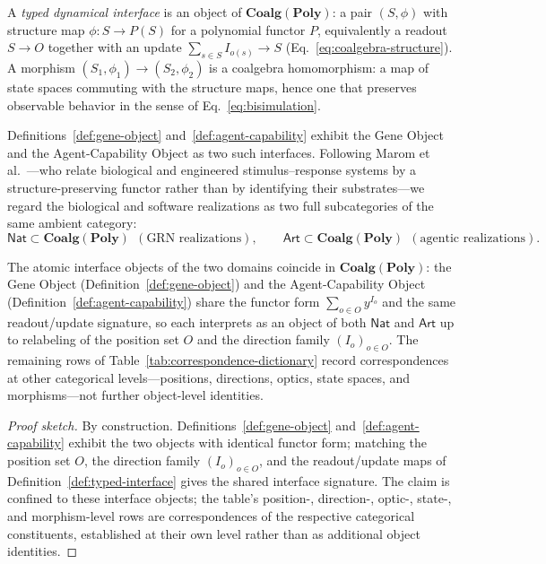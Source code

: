 \begin{definition}\label{def:typed-interface}
A \emph{typed dynamical interface} is an object of $\mathbf{Coalg}(\mathbf{Poly})$: a pair $(S,\phi)$ with
structure map $\phi\colon S \to P(S)$ for a polynomial functor $P$, equivalently a readout $S \to O$ together
with an update $\sum_{s\in S} I_{o(s)} \to S$ (Eq.~\ref{eq:coalgebra-structure}). A morphism
$(S_1,\phi_1)\to(S_2,\phi_2)$ is a coalgebra homomorphism: a map of state spaces commuting with the structure
maps, hence one that preserves observable behavior in the sense of Eq.~\ref{eq:bisimulation}.
\end{definition}

Definitions~\ref{def:gene-object} and~\ref{def:agent-capability} exhibit the Gene Object and the
Agent-Capability Object as two such interfaces. Following Marom et al.~\cite{marom2026category}---who relate
biological and engineered stimulus--response systems by a structure-preserving functor rather than by
identifying their substrates---we regard the biological and software realizations as two full subcategories of
the same ambient category:
\[
\mathsf{Nat} \subset \mathbf{Coalg}(\mathbf{Poly})\ \ (\text{GRN realizations}),
\qquad
\mathsf{Art} \subset \mathbf{Coalg}(\mathbf{Poly})\ \ (\text{agentic realizations}).
\]

\begin{proposition}\label{prop:substrate-independence}
The atomic interface objects of the two domains coincide in $\mathbf{Coalg}(\mathbf{Poly})$: the Gene Object
(Definition~\ref{def:gene-object}) and the Agent-Capability Object (Definition~\ref{def:agent-capability})
share the functor form $\sum_{o\in O} y^{I_o}$ and the same readout/update signature, so each interprets as an
object of both $\mathsf{Nat}$ and $\mathsf{Art}$ up to relabeling of the position set $O$ and the direction
family $(I_o)_{o\in O}$. The remaining rows of Table~\ref{tab:correspondence-dictionary} record
correspondences at other categorical levels---positions, directions, optics, state spaces, and
morphisms---not further object-level identities.
\end{proposition}

\begin{proof}[Proof sketch]
By construction. Definitions~\ref{def:gene-object} and~\ref{def:agent-capability} exhibit the two objects with
identical functor form; matching the position set $O$, the direction family $(I_o)_{o\in O}$, and the
readout/update maps of Definition~\ref{def:typed-interface} gives the shared interface signature. The claim is
confined to these interface objects; the table's position-, direction-, optic-, state-, and morphism-level
rows are correspondences of the respective categorical constituents, established at their own level rather than
as additional object identities.
\end{proof}

